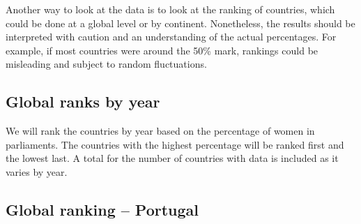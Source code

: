 \documentclass[a4paper,9pt,twocolumn,twoside,printwatermark=true]{pinp}
\begin{document}
Another way to look at the data is to look at the ranking of countries,
which could be done at a global level or by continent. Nonetheless, the
results should be interpreted with caution and an understanding of the
actual percentages. For example, if most countries were around the 50\%
mark, rankings could be misleading and subject to random fluctuations.

\subsection{Global ranks by year}\label{global-ranks-by-year}

We will rank the countries by year based on the percentage of women in
parliaments. The countries with the highest percentage will be ranked
first and the lowest last. A total for the number of countries with data
is included as it varies by year.

\begin{Shaded}
\begin{Highlighting}[]
\NormalTok{cWP[}\OperatorTok{!}
    \DataTypeTok{:=}\NormalTok{(} \NormalTok{(}\OperatorTok{-}
\StringTok{ }\NormalTok{.(Year)]}
\end{Highlighting}
\end{Shaded}

\subsection{Global ranking -- Portugal}\label{global-ranking-portugal}
\end{document}
